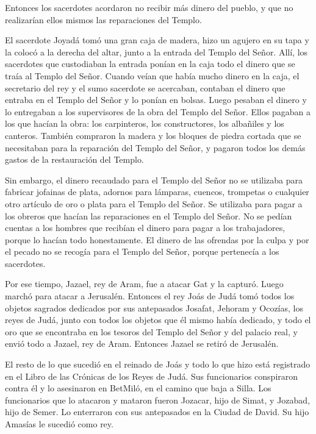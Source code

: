  Entonces los sacerdotes acordaron no recibir más dinero del
pueblo, y que no realizarían ellos mismos las reparaciones del Templo.

 El sacerdote Joyadá tomó una gran caja de madera, hizo un
agujero en su tapa y la colocó a la derecha del altar, junto a la
entrada del Templo del Señor. Allí, los sacerdotes que custodiaban la
entrada ponían en la caja todo el dinero que se traía al Templo del
Señor.  Cuando veían que había mucho dinero en la caja, el
secretario del rey y el sumo sacerdote se acercaban, contaban el dinero
que entraba en el Templo del Señor y lo ponían en bolsas. 
Luego pesaban el dinero y lo entregaban a los supervisores de la obra
del Templo del Señor. Ellos pagaban a los que hacían la obra: los
carpinteros, los constructores, los  albañiles y los
canteros. También compraron la madera y los bloques de piedra cortada
que se necesitaban para la reparación del Templo del Señor, y pagaron
todos los demás gastos de la restauración del Templo.

 Sin embargo, el dinero recaudado para el Templo del Señor
no se utilizaba para fabricar jofainas de plata, adornos para lámparas,
cuencos, trompetas o cualquier otro artículo de oro o plata para el
Templo del Señor.  Se utilizaba para pagar a los obreros
que hacían las reparaciones en el Templo del Señor.  No se
pedían cuentas a los hombres que recibían el dinero para pagar a los
trabajadores, porque lo hacían todo honestamente.  El
dinero de las ofrendas por la culpa y por el pecado no se recogía para
el Templo del Señor, porque pertenecía a los sacerdotes.

 Por ese tiempo, Jazael, rey de Aram, fue a atacar Gat y la
capturó. Luego marchó para atacar a Jerusalén.  Entonces el
rey Joás de Judá tomó todos los objetos sagrados dedicados por sus
antepasados Josafat, Jehoram y Ocozías, los reyes de Judá, junto con
todos los objetos que él mismo había dedicado, y todo el oro que se
encontraba en los tesoros del Templo del Señor y del palacio real, y
envió todo a Jazael, rey de Aram. Entonces Jazael se retiró de
Jerusalén.

 El resto de lo que sucedió en el reinado de Joás y todo lo
que hizo está registrado en el Libro de las Crónicas de los Reyes de
Judá.  Sus funcionarios conspiraron contra él y lo
asesinaron en BetMiló, en el camino que baja a Silla.  Los
funcionarios que lo atacaron y mataron fueron Jozacar, hijo de Simat, y
Jozabad, hijo de Semer. Lo enterraron con sus antepasados en la Ciudad
de David. Su hijo Amasías le sucedió como rey.

